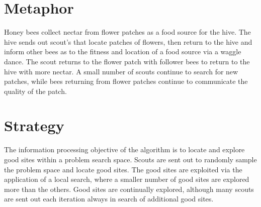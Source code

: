 \documentclass[a4paper, 11pt]{article}
\begin{document}
\section{Metaphor}
\label{sec:metaphor}
Honey bees collect nectar from flower patches as a food source for the hive. The hive sends out scout's that locate patches of flowers, then return to the hive and inform other bees as to the fitness and location of a food source via a waggle dance. The scout returns to the flower patch with follower bees to return to the hive with more nectar. A small number of scouts continue to search for new patches, while bees returning from flower patches continue to communicate the quality of the patch. 

\section{Strategy}
\label{sec:strategy}
The information processing objective of the algorithm is to locate and explore good sites within a problem search space.
Scouts are sent out to randomly sample the problem space and locate good sites. The good sites are exploited via the application of a local search, where a smaller number of good sites are explored more than the others. Good sites are continually explored, although many scouts are sent out each iteration always in search of additional good sites.
\end{document}
